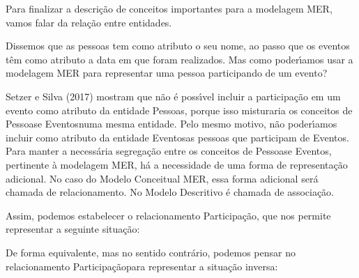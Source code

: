 \documentclass[
12pt,		%
openright,	%
twoside,  %
a4paper,			%
chapter=TITLE,		%
english,			%
french,				%
spanish,			%
brazil				%
]{USPSC-classe/USPSC}
\begin{document}
Para finalizar a descri\c{c}\~ao de conceitos importantes para a modelagem MER, vamos falar da rela\c{c}\~ao entre entidades.




Dissemos que as pessoas tem como atributo o seu nome, ao passo que os eventos t\^em como atributo a data em que foram realizados. Mas como poder\'{\i}amos usar a modelagem MER para representar uma pessoa participando de um evento?




Setzer e Silva (2017) mostram que n\~ao \'e poss\'{\i}vel incluir a participa\c{c}\~ao em um evento como atributo da entidade \textquotedbl Pessoas\textquotedbl , porque isso misturaria os conceitos de \textquotedbl Pessoas\textquotedbl  e \textquotedbl Eventos\textquotedbl  numa mesma entidade. Pelo mesmo motivo, n\~ao poder\'{\i}amos incluir como atributo da entidade \textquotedbl Eventos\textquotedbl  as  pessoas que participam de \textquotedbl Eventos\textquotedbl . Para manter a necess\'aria segrega\c{c}\~ao entre os conceitos de \textquotedbl Pessoas\textquotedbl  e \textquotedbl Eventos\textquotedbl , pertinente \`a modelagem MER, h\'a a necessidade de uma forma de representa\c{c}\~ao adicional. No caso do Modelo Conceitual MER, essa forma adicional ser\'a chamada de \textquotedbl relacionamento\textquotedbl . No Modelo Descritivo \'e chamada de \textquotedbl associa\c{c}\~ao\textquotedbl .




Assim, podemos estabelecer o relacionamento \textquotedbl Participa\c{c}\~ao\textquotedbl , que nos permite representar a seguinte situa\c{c}\~ao:





\noindent\begin{center}\mbox{\centering{}}\end{center}


De forma equivalente, mas no sentido contr\'ario, podemos pensar no  relacionamento \textquotedbl Participa\c{c}\~ao\textquotedbl  para representar a situa\c{c}\~ao inversa:





\noindent\begin{center}\mbox{\centering{}}\end{center}
\end{document}
